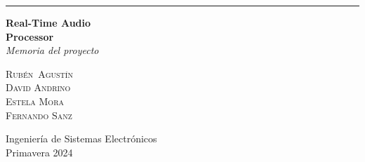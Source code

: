
\begin{titlepage}
    \raggedleft
    \rule{1pt}{\textheight}
    \hspace{0.05\textwidth}
    \parbox[b]{0.9\textwidth}{
            {\Huge\bfseries Real-Time Audio \\[5px] Processor}\\[\baselineskip] %
            {\Large\textit{Memoria del proyecto}}\\[7\baselineskip] %
        \vspace{0.45\textheight}
        
        {\Large\textsc{Rubén\ Agustín}}\\[0.5\baselineskip]
        {\Large\textsc{David Andrino}}\\[0.5\baselineskip]
        {\Large\textsc{Estela Mora}}\\[0.5\baselineskip]
        {\Large\textsc{Fernando Sanz}}\\
        \vspace{0.05\textheight}
        
        {\noindent\large Ingeniería de Sistemas Electrónicos}\\
        {\noindent\large Primavera 2024}\\
    }

\end{titlepage}